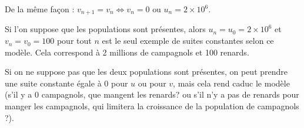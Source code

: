 \documentclass[10pt]{article}
\begin{document}
De la même façon : $v_{n+1}=v_{n} \iff v_{n}=0\text{ ou }u_{n}=2 \times 10^6$.

Si l'on suppose que les populations sont présentes, alors $u_{n} = u_0 = 2 \times 10^6$ et $v_{n}=v_0 = 100$ pour tout $n$ est le seul exemple de suites constantes selon ce modèle. Cela correspond à 2 millions de campagnols et 100 renards.
	
\smallskip

Si on ne suppose pas que les deux populations sont présentes, on peut prendre une suite constante égale à 0 pour $u$ ou pour $v$, mais cela rend caduc le modèle (s'il y a 0 campagnols, que mangent les renards? ou s'il n'y a pas de renards pour manger les campagnols, qui limitera la croissance de la population de campagnols ?).
\end{document}
